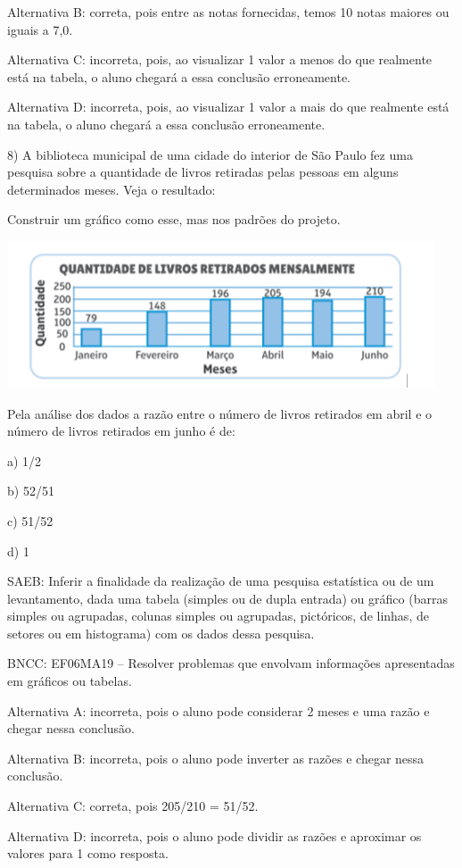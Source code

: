 Alternativa B: correta, pois entre as notas fornecidas, temos 10 notas
maiores ou iguais a 7,0.

Alternativa C: incorreta, pois, ao visualizar 1 valor a menos do que
realmente está na tabela, o aluno chegará a essa conclusão erroneamente.

Alternativa D: incorreta, pois, ao visualizar 1 valor a mais do que
realmente está na tabela, o aluno chegará a essa conclusão erroneamente.

8) A biblioteca municipal de uma cidade do interior de São Paulo fez uma
pesquisa sobre a quantidade de livros retiradas pelas pessoas em alguns
determinados meses. Veja o resultado:

Construir um gráfico como esse, mas nos padrões do projeto.

\includegraphics[width=5in,height=1.71875in]{./imgSAEB_6_MAT/media/image117.png}

Pela análise dos dados a razão entre o número de livros retirados em
abril e o número de livros retirados em junho é de:

a) 1/2

b) 52/51

c) 51/52

d) 1

SAEB: Inferir a finalidade da realização de uma pesquisa estatística ou
de um levantamento, dada uma tabela (simples ou de dupla entrada) ou
gráfico (barras simples ou agrupadas, colunas simples ou agrupadas,
pictóricos, de linhas, de setores ou em histograma) com os dados dessa
pesquisa.

BNCC: EF06MA19 -- Resolver problemas que envolvam informações
apresentadas em gráficos ou tabelas.~

Alternativa A: incorreta, pois o aluno pode considerar 2 meses e uma
razão e chegar nessa conclusão.

Alternativa B: incorreta, pois o aluno pode inverter as razões e chegar
nessa conclusão.

Alternativa C: correta, pois 205/210 = 51/52.

Alternativa D: incorreta, pois o aluno pode dividir as razões e
aproximar os valores para 1 como resposta.

